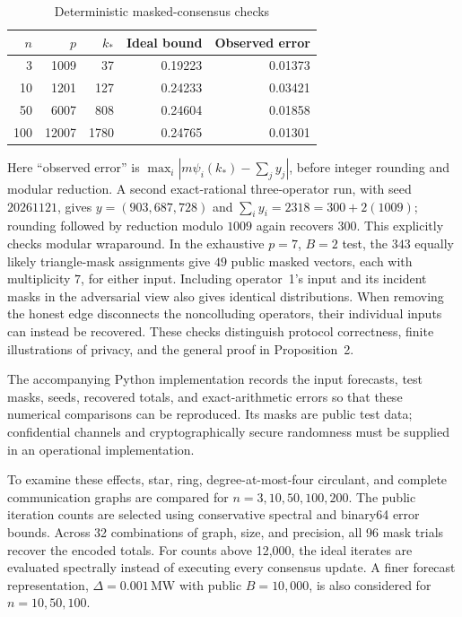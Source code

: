 \documentclass[journal]{IEEEtran}
\begin{document}
\begin{table}[hbt]
\centering
\caption{Deterministic masked-consensus checks}
\label{tab:mask_validation}
\begin{tabular}{rrrrr}
\hline
$n$ & $p$ & $k_*$ & Ideal bound & Observed error\\
\hline
3 & 1009 & 37 & 0.19223 & 0.01373\\
10 & 1201 & 127 & 0.24233 & 0.03421\\
50 & 6007 & 808 & 0.24604 & 0.01858\\
100 & 12007 & 1780 & 0.24765 & 0.01301\\
\hline
\end{tabular}
\end{table}

Here ``observed error'' is $\max_i|m\psi_i(k_*)-\sum_jy_j|$, before integer rounding and modular reduction. A second exact-rational three-operator run, with seed $20261121$, gives $y=(903,687,728)$ and $\sum_i y_i=2318=300+2(1009)$; rounding followed by reduction modulo $1009$ again recovers $300$. This explicitly checks modular wraparound. In the exhaustive $p=7$, $B=2$ test, the $343$ equally likely triangle-mask assignments give $49$ public masked vectors, each with multiplicity $7$, for either input. Including operator~1's input and its incident masks in the adversarial view also gives identical distributions. When removing the honest edge disconnects the noncolluding operators, their individual inputs can instead be recovered. These checks distinguish protocol correctness, finite illustrations of privacy, and the general proof in Proposition~2.

The accompanying Python implementation records the input forecasts, test masks, seeds, recovered totals, and exact-arithmetic errors so that these numerical comparisons can be reproduced. Its masks are public test data; confidential channels and cryptographically secure randomness must be supplied in an operational implementation.

To examine these effects, star, ring, degree-at-most-four circulant, and complete communication graphs are compared for $n=3,10,50,100,200$. The public iteration counts are selected using conservative spectral and binary64 error bounds. Across 32 combinations of graph, size, and precision, all 96 mask trials recover the encoded totals. For counts above 12,000, the ideal iterates are evaluated spectrally instead of executing every consensus update. A finer forecast representation, $\Delta=0.001$\,MW with public $B=10{,}000$, is also considered for $n=10,50,100$.
\end{document}
